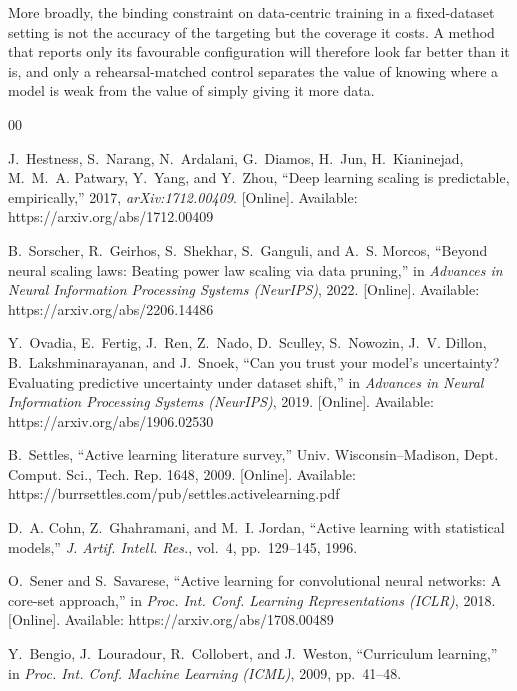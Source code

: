\documentclass[conference]{IEEEtran}
\begin{document}
More broadly, the binding constraint on data-centric training in a fixed-dataset setting
is not the accuracy of the targeting but the coverage it costs. A method that reports
only its favourable configuration will therefore look far better than it is, and only a
rehearsal-matched control separates the value of knowing where a model is weak from the
value of simply giving it more data.



\begin{thebibliography}{00}

J.~Hestness, S.~Narang, N.~Ardalani, G.~Diamos, H.~Jun, H.~Kianinejad,
M.~M.~A. Patwary, Y.~Yang, and Y.~Zhou,
``Deep learning scaling is predictable, empirically,''
2017, \emph{arXiv:1712.00409}.
[Online]. Available: https://arxiv.org/abs/1712.00409

B.~Sorscher, R.~Geirhos, S.~Shekhar, S.~Ganguli, and A.~S. Morcos,
``Beyond neural scaling laws: Beating power law scaling via data pruning,''
in \emph{Advances in Neural Information Processing Systems (NeurIPS)}, 2022.
[Online]. Available: https://arxiv.org/abs/2206.14486

Y.~Ovadia, E.~Fertig, J.~Ren, Z.~Nado, D.~Sculley, S.~Nowozin, J.~V. Dillon,
B.~Lakshminarayanan, and J.~Snoek,
``Can you trust your model's uncertainty? Evaluating predictive uncertainty
under dataset shift,''
in \emph{Advances in Neural Information Processing Systems (NeurIPS)}, 2019.
[Online]. Available: https://arxiv.org/abs/1906.02530

B.~Settles,
``Active learning literature survey,''
Univ. Wisconsin--Madison, Dept. Comput. Sci., Tech. Rep. 1648, 2009.
[Online]. Available: https://burrsettles.com/pub/settles.activelearning.pdf

D.~A. Cohn, Z.~Ghahramani, and M.~I. Jordan,
``Active learning with statistical models,''
\emph{J. Artif. Intell. Res.}, vol.~4, pp.~129--145, 1996.

O.~Sener and S.~Savarese,
``Active learning for convolutional neural networks: A core-set approach,''
in \emph{Proc. Int. Conf. Learning Representations (ICLR)}, 2018.
[Online]. Available: https://arxiv.org/abs/1708.00489

Y.~Bengio, J.~Louradour, R.~Collobert, and J.~Weston,
``Curriculum learning,''
in \emph{Proc. Int. Conf. Machine Learning (ICML)}, 2009, pp.~41--48.


\end{thebibliography}
\end{document}
